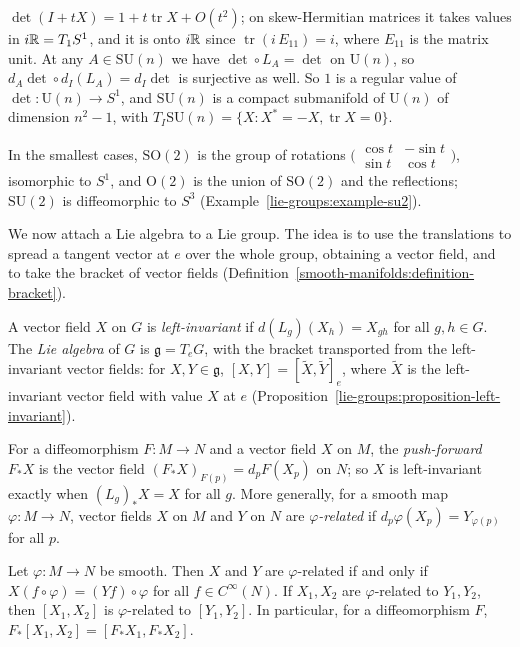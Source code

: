 \begin{example}
\begin{enumerate}
$\det(I + tX) = 1 + t\operatorname{tr}X + O(t^2)$; on skew-Hermitian matrices it takes values in $i\mathbb{R} = T_1S^1$, and it is onto $i\mathbb{R}$ since
$\operatorname{tr}(i\,E_{11}) = i$, where $E_{11}$ is the matrix unit. At any $A \in \mathrm{SU}(n)$ we have $\det \circ L_A = \det$ on $\mathrm{U}(n)$, so
$d_A\det \circ d_I(L_A) = d_I\det$ is surjective as well. So $1$ is a regular value of $\det \colon \mathrm{U}(n) \to S^1$, and $\mathrm{SU}(n)$ is a compact
submanifold of $\mathrm{U}(n)$ of dimension $n^2 - 1$, with $T_I\mathrm{SU}(n) = \{X : X^* = -X, \operatorname{tr}X = 0\}$.
\end{enumerate}
In the smallest cases, $\mathrm{SO}(2)$ is the group of rotations
$\bigl(\begin{smallmatrix}\cos t & -\sin t\\ \sin t & \cos t\end{smallmatrix}\bigr)$, isomorphic to $S^1$, and $\mathrm{O}(2)$ is the union of $\mathrm{SO}(2)$
and the reflections; $\mathrm{SU}(2)$ is diffeomorphic to $S^3$ (Example~\ref{lie-groups:example-su2}).
\end{example}

We now attach a Lie algebra to a Lie group. The idea is to use the translations to spread a tangent vector at $e$ over the whole group, obtaining a vector field,
and to take the bracket of vector fields (Definition~\ref{smooth-manifolds:definition-bracket}).

\begin{definition}\label{lie-groups:definition-lie-algebra-of-g}
A vector field $X$ on $G$ is \emph{left-invariant} if $d(L_g)(X_h) = X_{gh}$ for all $g, h \in G$. The \emph{Lie algebra} of $G$ is $\mathfrak{g} = T_eG$, with
the bracket transported from the left-invariant vector fields: for $X, Y \in \mathfrak{g}$, $[X, Y] = [\widetilde{X}, \widetilde{Y}]_e$, where
$\widetilde{X}$ is the left-invariant vector field with value $X$ at $e$ (Proposition~\ref{lie-groups:proposition-left-invariant}).
\end{definition}

For a diffeomorphism $F \colon M \to N$ and a vector field $X$ on $M$, the \emph{push-forward} $F_*X$ is the vector field $(F_*X)_{F(p)} = d_pF(X_p)$ on $N$;
so $X$ is left-invariant exactly when $(L_g)_*X = X$ for all $g$. More generally, for a smooth map $\varphi \colon M \to N$, vector fields $X$ on $M$ and $Y$ on
$N$ are \emph{$\varphi$-related} if $d_p\varphi(X_p) = Y_{\varphi(p)}$ for all $p$.

\begin{lemma}\label{lie-groups:lemma-related-fields}
Let $\varphi \colon M \to N$ be smooth. Then $X$ and $Y$ are $\varphi$-related if and only if $X(f \circ \varphi) = (Yf) \circ \varphi$ for all $f \in C^\infty(N)$. If
$X_1, X_2$ are $\varphi$-related to $Y_1, Y_2$, then $[X_1, X_2]$ is $\varphi$-related to $[Y_1, Y_2]$. In particular, for a diffeomorphism $F$,
$F_*[X_1, X_2] = [F_*X_1, F_*X_2]$.
\end{lemma}

